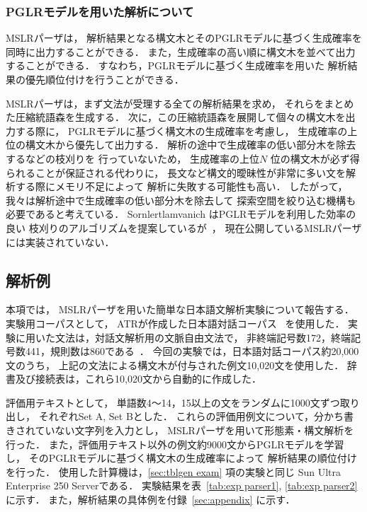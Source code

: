 \subsubsection{PGLRモデルを用いた解析について}
\label{sec:pglr analysis}

MSLRパーザは，
解析結果となる構文木とそのPGLRモデルに基づく生成確率を
同時に出力することができる．
また，生成確率の高い順に構文木を並べて出力することができる．
すなわち，PGLRモデルに基づく生成確率を用いた
解析結果の優先順位付けを行うことができる．

MSLRパーザは，まず文法が受理する全ての解析結果を求め，
それらをまとめた圧縮統語森を生成する．
次に，この圧縮統語森を展開して個々の構文木を出力する際に，
PGLRモデルに基づく構文木の生成確率を考慮し，
生成確率の上位の構文木から優先して出力する．
解析の途中で生成確率の低い部分木を除去するなどの枝刈りを
行っていないため，
生成確率の上位$N$ 位の構文木が必ず得られることが保証される代わりに，
長文など構文的曖昧性が非常に多い文を解析する際にメモリ不足によって
解析に失敗する可能性も高い．
したがって，我々は解析途中で生成確率の低い部分木を除去して
探索空間を絞り込む機構も必要であると考えている．
Sornlertlamvanich はPGLRモデルを利用した効率の良い
枝刈りのアルゴリズムを提案しているが~\cite{sornlertlamvanich:98:a}，
現在公開しているMSLRパーザには実装されていない．

\subsection{解析例}
\label{sec:exp}

本項では，
MSLRパーザを用いた簡単な日本語文解析実験について報告する．
実験用コーパスとして，
ATRが作成した日本語対話コーパス~\cite{morimoto:94:a} を使用した．
実験に用いた文法は，対話文解析用の文脈自由文法で，
非終端記号数172，終端記号数441，規則数は860である~\cite{tanaka:97:a}．
今回の実験では，日本語対話コーパス約20,000文のうち，
上記の文法による構文木が付与された例文10,020文を使用した．
辞書及び接続表は，これら10,020文から自動的に作成した．

評価用テキストとして，
単語数4〜14，15以上の文をランダムに1000文ずつ取り出し，
それぞれSet A, Set Bとした．
これらの評価用例文について，分かち書きされていない文字列を入力とし，
MSLRパーザを用いて形態素・構文解析を行った．
また，評価用テキスト以外の例文約9000文からPGLRモデルを学習し，
そのPGLRモデルに基づく構文木の生成確率によって
解析結果の順位付けを行った．
使用した計算機は，\ref{sec:tblgen exam} 項の実験と同じ
Sun Ultra Enterprise 250 Serverである．
実験結果を表~\ref{tab:exp parser1}, \ref{tab:exp parser2} に示す．
また，解析結果の具体例を付録~\ref{sec:appendix} に示す．

